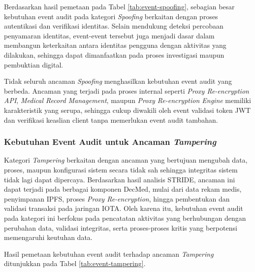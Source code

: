 Berdasarkan hasil pemetaan pada Tabel \ref{tab:event-spoofing}, sebagian besar kebutuhan event audit pada kategori \textit{Spoofing} berkaitan dengan proses autentikasi dan verifikasi identitas. Selain mendukung deteksi percobaan penyamaran identitas, event-event tersebut juga menjadi dasar dalam membangun keterkaitan antara identitas pengguna dengan aktivitas yang dilakukan, sehingga dapat dimanfaatkan pada proses investigasi maupun pembuktian digital.

Tidak seluruh ancaman \textit{Spoofing} menghasilkan kebutuhan event audit yang berbeda. Ancaman yang terjadi pada proses internal seperti \textit{Proxy Re-encryption API}, \textit{Medical Record Management}, maupun \textit{Proxy Re-encryption Engine} memiliki karakteristik yang serupa, sehingga cukup diwakili oleh event validasi token JWT dan verifikasi keaslian client tanpa memerlukan event audit tambahan.

\subsubsection{Kebutuhan Event Audit untuk Ancaman \textit{Tampering}}

Kategori \textit{Tampering} berkaitan dengan ancaman yang bertujuan mengubah data, proses, maupun konfigurasi sistem secara tidak sah sehingga integritas sistem tidak lagi dapat dipercaya. Berdasarkan hasil analisis STRIDE, ancaman ini dapat terjadi pada berbagai komponen DecMed, mulai dari data rekam medis, penyimpanan IPFS, proses \textit{Proxy Re-encryption}, hingga pembentukan dan validasi transaksi pada jaringan IOTA. Oleh karena itu, kebutuhan event audit pada kategori ini berfokus pada pencatatan aktivitas yang berhubungan dengan perubahan data, validasi integritas, serta proses-proses kritis yang berpotensi memengaruhi keutuhan data.

Hasil pemetaan kebutuhan event audit terhadap ancaman \textit{Tampering} ditunjukkan pada Tabel \ref{tab:event-tampering}.

